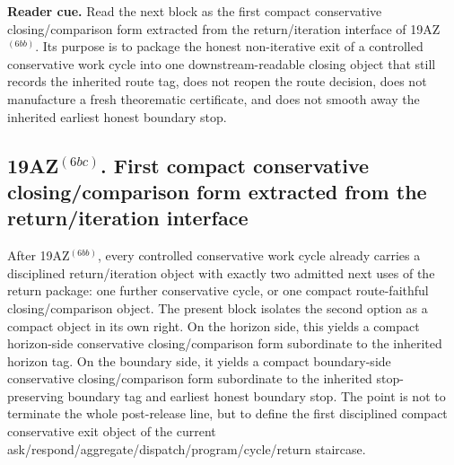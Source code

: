 \noindent\textbf{Reader cue.} Read the next block as the first compact conservative closing/comparison form extracted from the return/iteration interface of 19AZ$^{(6bb)}$. Its purpose is to package the honest non-iterative exit of a controlled conservative work cycle into one downstream-readable closing object that still records the inherited route tag, does not reopen the route decision, does not manufacture a fresh theorematic certificate, and does not smooth away the inherited earliest honest boundary stop.

\subsection*{19AZ$^{(6bc)}$. First compact conservative closing/comparison form extracted from the return/iteration interface}
\label{sec:first-compact-conservative-closing-comparison-form-extracted-from-the-return-iteration-interface}
After 19AZ$^{(6bb)}$, every controlled conservative work cycle already carries a disciplined return/iteration object with exactly two admitted next uses of the return package: one further conservative cycle, or one compact route-faithful closing/comparison object. The present block isolates the second option as a compact object in its own right. On the horizon side, this yields a compact horizon-side conservative closing/comparison form subordinate to the inherited horizon tag. On the boundary side, it yields a compact boundary-side conservative closing/comparison form subordinate to the inherited stop-preserving boundary tag and earliest honest boundary stop. The point is not to terminate the whole post-release line, but to define the first disciplined compact conservative exit object of the current ask/respond/aggregate/dispatch/program/cycle/return staircase.

